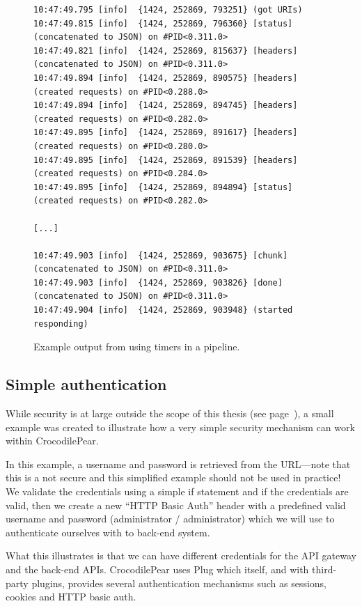 \documentclass{cslthse-msc}
\begin{document}
\begin{figure}[H]
  \centering
\begin{lstlisting}[breaklines=true,frame=single]
10:47:49.795 [info]  {1424, 252869, 793251} (got URIs)
10:47:49.815 [info]  {1424, 252869, 796360} [status] (concatenated to JSON) on #PID<0.311.0>
10:47:49.821 [info]  {1424, 252869, 815637} [headers] (concatenated to JSON) on #PID<0.311.0>
10:47:49.894 [info]  {1424, 252869, 890575} [headers] (created requests) on #PID<0.288.0>
10:47:49.894 [info]  {1424, 252869, 894745} [headers] (created requests) on #PID<0.282.0>
10:47:49.895 [info]  {1424, 252869, 891617} [headers] (created requests) on #PID<0.280.0>
10:47:49.895 [info]  {1424, 252869, 891539} [headers] (created requests) on #PID<0.284.0>
10:47:49.895 [info]  {1424, 252869, 894894} [status] (created requests) on #PID<0.282.0>

[...]

10:47:49.903 [info]  {1424, 252869, 903675} [chunk] (concatenated to JSON) on #PID<0.311.0>
10:47:49.903 [info]  {1424, 252869, 903826} [done] (concatenated to JSON) on #PID<0.311.0>
10:47:49.904 [info]  {1424, 252869, 903948} (started responding)
\end{lstlisting}
  \caption{Example output from using timers in a pipeline.}
\end{figure}

\subsection{Simple authentication}
While security is at large outside the scope of this thesis (see page~\pageref{sec:security}), a small example was created to illustrate how a very simple security mechanism can work within CrocodilePear.

In this example, a username and password is retrieved from the URL---note that this is a not secure and this simplified example should not be used in practice! We validate the credentials using a simple if statement and if the credentials are valid, then we create a new \enquote{HTTP Basic Auth} header with a predefined valid username and password (administrator / administrator) which we will use to authenticate ourselves with to back-end system.

What this illustrates is that we can have different credentials for the API gateway and the back-end APIs. CrocodilePear uses Plug which itself, and with third-party plugins, provides several authentication mechanisms such as sessions, cookies and HTTP basic auth.
\end{document}
